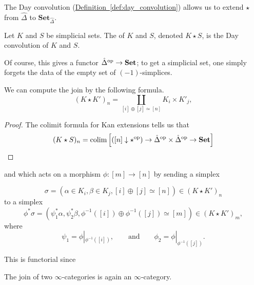 \documentclass[main.tex]{subfiles}
\begin{document}
The Day convolution (\hyperref[def:day_convolution]{Definition~\ref*{def:day_convolution}}) allows us to extend $\star$ from $\hat{\Delta}$ to $\mathbf{Set}_{\hat{\Delta}}$.

\begin{definition}
  \label{def:join_of_simplicial_sets}
  Let $K$ and $S$ be simplicial sets. The  of $K$ and $S$, denoted $K \star S$, is the Day convolution of $K$ and $S$.
\end{definition}

Of course, this gives a functor $\hat{\Delta}^{\mathrm{op}} \to \mathbf{Set}$; to get a simplicial set, one simply forgets the data of the empty set of $(-1)$-simplices.

\begin{theorem}
  We can compute the join by the following formula.
  \begin{equation*}
    (K \star K')_{n} = \coprod_{[i] \oplus [j] \simeq [n]} K_{i} \times K'_{j},
  \end{equation*}
\end{theorem}
\begin{proof}
  The colimit formula for Kan extensions tells us that
  \begin{equation*}
    (K \star S)_{n} = \operatorname*{colim}\left[ ([n] \downarrow \star^{\mathrm{op}}) \to \hat{\Delta}^{\mathrm{op}} \times \hat{\Delta}^{\mathrm{op}} \to \mathbf{Set} \right]
  \end{equation*}
\end{proof}

and which acts on a morphism $\phi\colon [m] \to [n]$ by sending a simplex

\begin{equation*}
  \sigma = (\alpha \in K_{i}, \beta \in K_{j}, [i] \oplus [j] \simeq [n]) \in (K \star K')_{n}
\end{equation*}
to a simplex
\begin{equation*}
  \phi^{*}\sigma = (\psi^{*}_{1} \alpha, \psi^{*}_{2} \beta, \phi^{-1}([i]) \oplus \phi^{-1}([j]) \simeq [m]) \in (K \star K')_{m},
\end{equation*}
where
\begin{equation*}
  \psi_{1} = \phi|_{\phi^{-1}([i])},\qquad\text{and}\qquad \phi_{2} = \phi|_{\phi^{-1}([j])}.
\end{equation*}

This is functorial since

\begin{proposition}
  The join of two $\infty$-categories is again an $\infty$-category.
\end{proposition}
\end{document}
